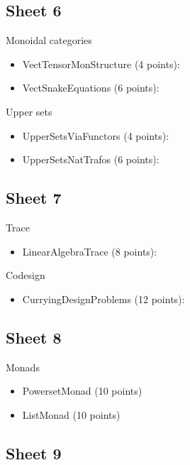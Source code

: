\subsection{Sheet 6}

Monoidal categories
\begin{itemize}
	\item VectTensorMonStructure (4 points): 
	\item VectSnakeEquations (6 points): 
\end{itemize}

Upper sets
\begin{itemize}
	\item UpperSetsViaFunctors (4 points): 
	\item UpperSetsNatTrafos (6 points): 
\end{itemize}

\subsection{Sheet 7}

Trace
\begin{itemize}
	\item LinearAlgebraTrace (8 points): 
\end{itemize}

Codesign
\begin{itemize}
	\item CurryingDesignProblems (12 points): 
\end{itemize}

\subsection{Sheet 8}

Monads
\begin{itemize}
	\item PowersetMonad (10 points)  
	\item ListMonad (10 points) 
\end{itemize}

\subsection{Sheet 9}

